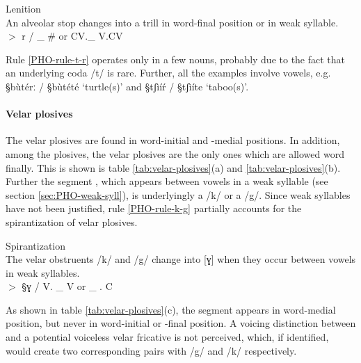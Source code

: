 \begin{Rule}\label{PHO-rule-t-r}{Lenition}\\
An  alveolar stop changes into a  trill in word-final position or in weak
syllable.\\
 {} $>$ r   /   \_ \#  or  CV.\_ V.CV
\end{Rule}

Rule \ref{PHO-rule-t-r} operates  only in a few nouns, probably due to the fact
that 
 an underlying coda /t/ is rare.  Further,  all the examples
involve {\sc [+atr, -ro]} vowels,  e.g. {\S bùtérː} / {\S bùtété}
`turtle(s)' and 
{\S tʃìíŕ} / {\S tʃìíte} `taboo(s)'. 


\paragraph{Velar plosives}
\label{sec:PHO-vel-plos}  

The velar plosives are found in word-initial and -medial positions. In
addition, among the plosives,  the velar plosives are the only ones which are
allowed word
finally. This is shown is table \ref{tab:velar-plosives}(a)  and
\ref{tab:velar-plosives}(b). Further the
segment {\I [ɣ]}, which appears between vowels in a
weak syllable (see section \ref{sec:PHO-weak-syll}),  is underlyingly a {\I
/k/} or a {\I /g/}. Since weak syllables have not been justified, rule
\ref{PHO-rule-k-g} partially accounts for the spirantization  of velar
plosives.


\begin{Rule}\label{PHO-rule-k-g}{Spirantization}\\
The velar obstruents  /k/ and /g/  change into  [ɣ]  when they occur
between vowels in weak syllables.\\
{}  $>$  {\S ɣ}  /  V. \_ V or  \_ . C
\end{Rule}


As shown in table \ref{tab:velar-plosives}(c), the segment {\I [ɣ]} appears in
word-medial position, but never in word-initial or  -final position.  A  voicing
distinction between {\I [ɣ]} and a potential 
voiceless velar fricative {\I
[x]} is not perceived, which,  if identified, would create two corresponding
pairs with {\I /g/}
and {\I /k/}
respectively. 


